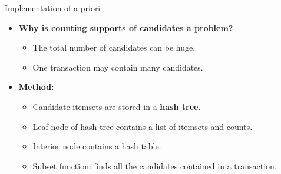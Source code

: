 \documentclass[aspectratio=169,t]{beamer}
\begin{document}
  {
    \begin{frame}{Implementation of a priori}
    \begin{itemize}
      \item \textbf{Why is counting supports of candidates a problem?}
      \begin{itemize}
        \item The total number of candidates can be huge.
        \item One transaction may contain many candidates.
      \end{itemize}
      \item \textbf{Method:}
      \begin{itemize}
        \item Candidate itemsets are stored in a \textbf{hash tree}.
        \item Leaf node of hash tree contains a list of itemsets and counts.
        \item Interior node contains a hash table.
        \item Subset function: finds all the candidates contained in a transaction.
      \end{itemize}
    \end{itemize}    
    \end{frame}
  }
\end{document}
